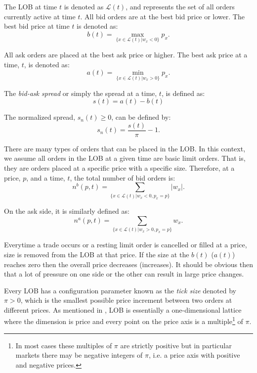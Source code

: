 The LOB at time $t$ is denoted as $\mathcal{L}(t)$, and represents the set of all orders currently active at time $t$. All bid orders are at the best bid price or lower. The best bid price at time $t$ is denoted as:
\begin{equation}
\label{top_bid}
b(t) =  \max_{\{x \in \mathcal{L}(t)|w_x<0 \}} p_x.
\end{equation}

All ask orders are placed at the best ask price or higher. The best ask price at a time, $t$, is denoted as:
\begin{equation}
\label{top_ask}
a(t) = \min_{\{x \in \mathcal{L}(t)|w_x>0 \}} p_x.
\end{equation}

The \textit{bid-ask spread} or simply the spread at a time, $t$, is defined as:
\begin{equation}
s(t) = a(t) - b(t)
\end{equation}

The normalized spread, $s_n(t) \geq 0$, can be defined by: 
\begin{equation}
s_n(t) = \frac{s(t)}{\pi} - 1.
\end{equation}

There are many types of orders that can be placed in the LOB. In this context, we assume all orders in the LOB at a given time are basic limit orders. That is, they are orders placed at a specific price with a specific size. Therefore, at a price, $p$, and a time, $t$, the total number of bid orders is:
\begin{equation}
\label{bid_qty}
n^b(p, t) = \sum_{\{x \in \mathcal{L}(t)|w_x<0 , p_x=p\}} |w_x|.
\end{equation}

On the ask side, it is similarly defined as:
\begin{equation}
\label{ask_qty}
n^a(p, t) = \sum_{\{x \in \mathcal{L}(t)|w_x>0 , p_x=p\}}  w_x.
\end{equation}

Everytime a trade occurs or a resting limit order is cancelled or filled at a price, size is removed from the LOB at that price. If the size at the $b(t)$ ($a(t)$) reaches zero then the overall price decreases (increases). It should be obvious then that a lot of pressure on one side or the other can result in large price changes.

Every LOB has a configuration parameter known as the \textit{tick size} denoted by $\pi >0$, which is the smallest possible price increment between two orders at different prices. As mentioned in \cite{gould2016queue}, LOB is essentially a one-dimensional lattice where the dimension is price and every point on the price axis is a multiple\footnote{In most cases these multiples of $\pi$ are strictly positive but in particular markets there may be negative integers of $\pi$, i.e. a price axis with positive and negative prices.} of $\pi$.

